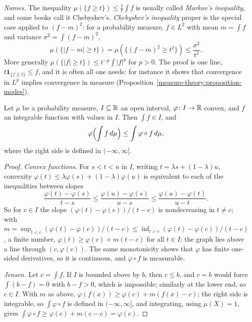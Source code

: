 \begin{remark}\label{measure-theory:remark-markov-chebyshev}
\emph{Names.} The inequality $\mu(\{f \geq t\}) \leq \frac1t\int f$ is usually called \emph{Markov's inequality}, and some books call it Chebyshev's. \emph{Chebyshev's inequality} proper is the
special case applied to $(f - m)^2$: for a probability measure, $f \in L^2$ with mean $m = \int f$ and variance $\sigma^2 = \int(f - m)^2$,
\[
\mu(\{|f - m| \geq t\}) = \mu(\{(f - m)^2 \geq t^2\}) \leq \frac{\sigma^2}{t^2}.
\]
More generally $\mu(\{|f| \geq t\}) \leq t^{-p}\int|f|^p$ for $p > 0$. The proof is one line, $t\mathbf{1}_{\{f \geq t\}} \leq f$, and it is often all one needs: for instance it shows that
convergence in $L^p$ implies convergence in measure (Proposition~\ref{measure-theory:proposition-modes}).
\end{remark}

\begin{proposition}\label{measure-theory:proposition-jensen}
Let $\mu$ be a probability measure, $I \subseteq \mathbb{R}$ an open interval, $\varphi \colon I \to \mathbb{R}$ convex, and $f$ an integrable function with values in $I$. Then $\int f \in I$, and
\[
\varphi\Bigl(\int f\,d\mu\Bigr) \leq \int\varphi \circ f\,d\mu,
\]
where the right side is defined in $(-\infty, \infty]$.
\end{proposition}

\begin{proof}
\emph{Convex functions.} For $s < t < u$ in $I$, writing $t = \lambda s + (1 - \lambda)u$, convexity $\varphi(t) \leq \lambda\varphi(s) + (1 - \lambda)\varphi(u)$ is equivalent to each of the inequalities
between slopes
\[
\frac{\varphi(t) - \varphi(s)}{t - s} \leq \frac{\varphi(u) - \varphi(s)}{u - s} \leq \frac{\varphi(u) - \varphi(t)}{u - t}.
\]
So for $c \in I$ the slope $(\varphi(t) - \varphi(c))/(t - c)$ is nondecreasing in $t \neq c$; with $m = \sup_{t < c}(\varphi(t) - \varphi(c))/(t - c) \leq \inf_{t > c}(\varphi(t) - \varphi(c))/(t - c)$,
a finite number, $\varphi(t) \geq \varphi(c) + m(t - c)$ for all $t \in I$: the graph lies above a line through $(c, \varphi(c))$. The same monotonicity shows that $\varphi$ has finite one-sided
derivatives, so it is continuous, and $\varphi \circ f$ is measurable.

\emph{Jensen.} Let $c = \int f$. If $I$ is bounded above by $b$, then $c \leq b$, and $c = b$ would force $\int(b - f) = 0$ with $b - f > 0$, which is impossible; similarly at the lower end, so
$c \in I$. With $m$ as above, $\varphi(f(x)) \geq \varphi(c) + m(f(x) - c)$; the right side is integrable, so $\int\varphi \circ f$ is defined in $(-\infty, \infty]$, and integrating, using $\mu(X) = 1$,
gives $\int\varphi \circ f \geq \varphi(c) + m(c - c) = \varphi(c)$.
\end{proof}

